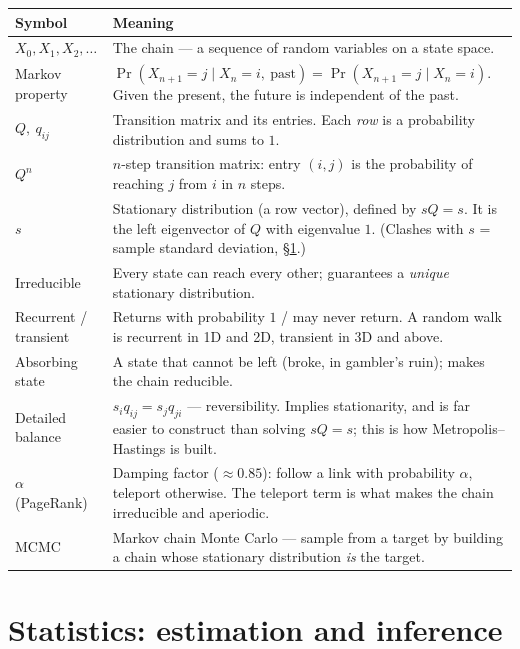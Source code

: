 \documentclass[10pt,letterpaper,onecolumn]{article}
\makeatletter
\newenvironment{symtab}
  {\begin{longtable}{@{}>{\raggedright\arraybackslash}p{0.26\textwidth}%
                       >{\raggedright\arraybackslash}p{0.70\textwidth}@{}}
   \toprule
   \textbf{Symbol} & \textbf{Meaning} \\
   \midrule
   \endhead
   \bottomrule
   \endfoot}
  {\end{longtable}}
\makeatother
\begin{document}
\begin{symtab}
$X_0, X_1, X_2,\dots$ & The chain — a sequence of random variables on a state space. \\
Markov property & $\Pr(X_{n+1}=j \mid X_n=i,\ \text{past}) = \Pr(X_{n+1}=j \mid X_n=i)$. Given the present, the future is independent of the past. \\
$Q,\ q_{ij}$ & Transition matrix and its entries. Each \emph{row} is a probability distribution and sums to $1$. \\
$Q^{n}$ & $n$-step transition matrix: entry $(i,j)$ is the probability of reaching $j$ from $i$ in $n$ steps. \\
$s$ & Stationary distribution (a row vector), defined by $sQ = s$. It is the left eigenvector of $Q$ with eigenvalue $1$. (Clashes with $s$ = sample standard deviation, \S\ref{sec:inference}.) \\
Irreducible & Every state can reach every other; guarantees a \emph{unique} stationary distribution. \\
Recurrent / transient & Returns with probability $1$ / may never return. A random walk is recurrent in 1D and 2D, transient in 3D and above. \\
Absorbing state & A state that cannot be left (broke, in gambler's ruin); makes the chain reducible. \\
Detailed balance & $s_i q_{ij} = s_j q_{ji}$ — reversibility. Implies stationarity, and is far easier to construct than solving $sQ=s$; this is how Metropolis--Hastings is built. \\
$\alpha$ (PageRank) & Damping factor ($\approx 0.85$): follow a link with probability $\alpha$, teleport otherwise. The teleport term is what makes the chain irreducible and aperiodic. \\
MCMC & Markov chain Monte Carlo — sample from a target by building a chain whose stationary distribution \emph{is} the target. \\
\end{symtab}

\section{Statistics: estimation and inference}
\label{sec:inference}
\end{document}
